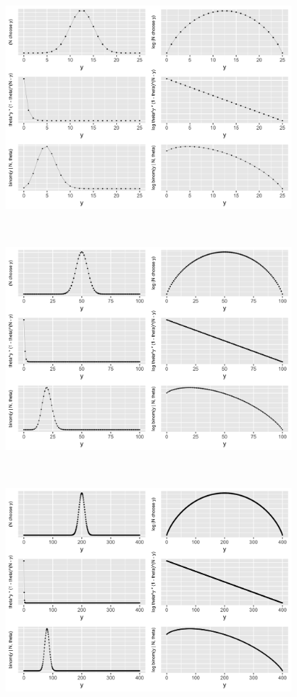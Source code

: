\documentclass[10pt]{report}
\begin{document}
%
\\[-12pt]
\begin{center}
\includegraphics[width=0.8\textwidth]{img/binomial-concentration-25.png}
\end{center}

%
\\[-12pt]
\begin{center}
\includegraphics[width=0.8\textwidth]{img/binomial-concentration-100.png}
\end{center}

%
\\[-12pt]
\begin{center}
\includegraphics[width=0.8\textwidth]{img/binomial-concentration-400.png}
\end{center}
\end{document}
